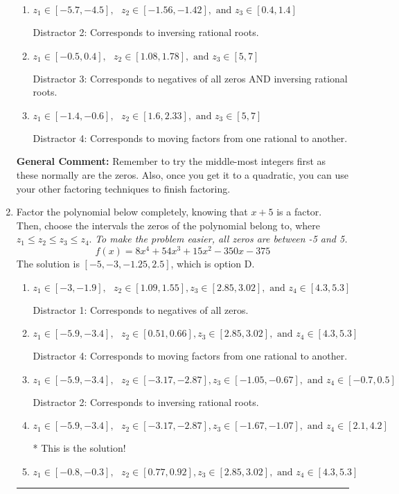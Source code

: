 \documentclass{extbook}[14pt]
\newcommand{\litem}[1]{\item #1

\rule{\textwidth}{0.4pt}}
\begin{document}
\begin{enumerate}
{\begin{enumerate}[label=\Alph*.]
* This is the solution!
\item \( z_1 \in [-5.7, -4.5], \text{   }  z_2 \in [-1.56, -1.42], \text{   and   } z_3 \in [0.4, 1.4] \)

 Distractor 2: Corresponds to inversing rational roots.
\item \( z_1 \in [-0.5, 0.4], \text{   }  z_2 \in [1.08, 1.78], \text{   and   } z_3 \in [5, 7] \)

 Distractor 3: Corresponds to negatives of all zeros AND inversing rational roots.
\item \( z_1 \in [-1.4, -0.6], \text{   }  z_2 \in [1.6, 2.33], \text{   and   } z_3 \in [5, 7] \)

 Distractor 4: Corresponds to moving factors from one rational to another.
\end{enumerate}

\textbf{General Comment:} Remember to try the middle-most integers first as these normally are the zeros. Also, once you get it to a quadratic, you can use your other factoring techniques to finish factoring.
}
\litem{
Factor the polynomial below completely, knowing that $x+5$ is a factor. Then, choose the intervals the zeros of the polynomial belong to, where $z_1 \leq z_2 \leq z_3 \leq z_4$. \textit{To make the problem easier, all zeros are between -5 and 5.}
\[ f(x) = 8x^{4} +54 x^{3} +15 x^{2} -350 x -375 \]The solution is \( [-5, -3, -1.25, 2.5] \), which is option D.\begin{enumerate}[label=\Alph*.]
\item \( z_1 \in [-3, -1.9], \text{   }  z_2 \in [1.09, 1.55], z_3 \in [2.85, 3.02], \text{   and   } z_4 \in [4.3, 5.3] \)

 Distractor 1: Corresponds to negatives of all zeros.
\item \( z_1 \in [-5.9, -3.4], \text{   }  z_2 \in [0.51, 0.66], z_3 \in [2.85, 3.02], \text{   and   } z_4 \in [4.3, 5.3] \)

 Distractor 4: Corresponds to moving factors from one rational to another.
\item \( z_1 \in [-5.9, -3.4], \text{   }  z_2 \in [-3.17, -2.87], z_3 \in [-1.05, -0.67], \text{   and   } z_4 \in [-0.7, 0.5] \)

 Distractor 2: Corresponds to inversing rational roots.
\item \( z_1 \in [-5.9, -3.4], \text{   }  z_2 \in [-3.17, -2.87], z_3 \in [-1.67, -1.07], \text{   and   } z_4 \in [2.1, 4.2] \)

* This is the solution!
\item \( z_1 \in [-0.8, -0.3], \text{   }  z_2 \in [0.77, 0.92], z_3 \in [2.85, 3.02], \text{   and   } z_4 \in [4.3, 5.3] \)


\end{enumerate}}
\end{enumerate}
\end{document}
